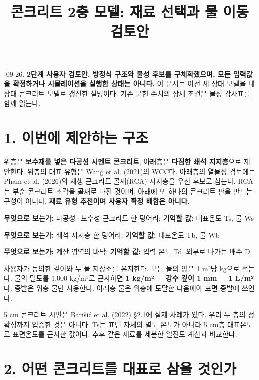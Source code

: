 \documentclass[11pt,a4paper]{article}
\title{콘크리트 2층 모델: 재료 선택과 물 이동 검토안}
\date{}
\begin{document}
-09-26. \textbf{2단계 사용자 검토안. 방정식 구조와 물성 후보를 구체화했으며, 모든 입력값을 확정하거나 시뮬레이션을 실행한 상태는 아니다.} 이 문서는 이전 세 상태 모델을 네 상태 콘크리트 모델로 갱신한 설명이다. 기존 문헌 수치의 상세 조건은 \href{\detokenize{concrete-parameter-review.md}}{물성 감사표}를 함께 읽는다.

\section{1. 이번에 제안하는 구조}

위층은 \textbf{보수재를 넣은 다공성 시멘트 콘크리트}, 아래층은 \textbf{다짐한 쇄석 지지층}으로 제안한다. 위층의 대표 유형은 Wang et al. (2021)의 WCC다. 아래층의 열물성 검토에는 Pham et al. (2026)의 재생 콘크리트 골재(RCA) 지지층을 우선 후보로 삼는다. RCA는 부순 콘크리트 조각을 골재로 다진 것이며, 아래에 또 하나의 콘크리트 판을 만드는 구성이 아니다. \textbf{재료 유형 추천이며 사용자 확정 배합은 아니다.}

\begin{description}[leftmargin=0pt,style=nextline]
\item[표면에서 0-5 cm] \textbf{무엇으로 보는가:} 다공성·보수성 콘크리트 한 덩어리; \textbf{기억할 값:} 대표온도 Ts, 물 Ws
\item[깊이 5-30 cm] \textbf{무엇으로 보는가:} 쇄석 지지층 한 덩어리; \textbf{기억할 값:} 대표온도 Tb, 물 Wb
\item[깊이 30 cm] \textbf{무엇으로 보는가:} 계산 영역의 바닥; \textbf{기억할 값:} 입력 온도 Td, 외부로 나가는 배수 D
\end{description}

사용자가 동의한 깊이와 두 물 저장소를 유지한다. 모든 물의 양은 1 m²당 kg으로 적는다. 물의 밀도를 1,000 kg/m³로 근사하면 \textbf{1 kg/m² = 강수 깊이 1 mm = 1 L/m²}다. 증발은 위층 물만 사용한다. 아래층 물은 위층에 도달한 다음에야 표면 증발에 쓰인다.

5 cm 콘크리트 시편은 \href{\detokenize{https://doi.org/10.3390/su14116638}}{Barišić et al. (2022)} §2.1에 실제 사례가 있다. 우리 두 층의 정확성까지 입증한 것은 아니다. Ts는 표면 자체의 별도 온도가 아니라 5 cm층 대표온도로 표면온도를 근사한 값이다. 추후 같은 재료를 세분한 열전도 계산과 비교한다.

\section{2. 어떤 콘크리트를 대표로 삼을 것인가}
\end{document}

